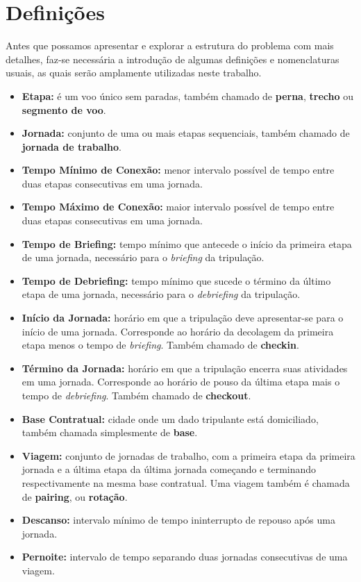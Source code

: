 
\section{Definições}
\label{sec:definicoes}

Antes que possamos apresentar e explorar a estrutura do problema com mais detalhes, faz-se
necessária a introdução de algumas definições e nomenclaturas usuais, as quais serão amplamente
utilizadas neste trabalho.

\begin{itemize}
	\item {\bf Etapa:} é um voo único sem paradas, também chamado de {\bf perna}, {\bf trecho} ou 
	{\bf segmento de voo}.
	\item {\bf Jornada:} conjunto de uma ou mais etapas sequenciais, também chamado de {\bf jornada 
	de trabalho}. 
	\item {\bf Tempo Mínimo de Conexão:} menor intervalo possível de tempo entre duas etapas 
	consecutivas em uma jornada.
	\item {\bf Tempo Máximo de Conexão:} maior intervalo possível de tempo entre duas etapas 
	consecutivas em uma jornada.
	\item {\bf Tempo de Briefing:} tempo mínimo que antecede o início da primeira etapa de uma
	jornada, necessário para o {\it briefing} da tripulação.
	\item {\bf Tempo de Debriefing:} tempo mínimo que sucede o término da último etapa de uma
	jornada, necessário para o {\it debriefing} da tripulação.
	\item {\bf Início da Jornada:} horário em que a tripulação deve apresentar-se para o início
	de uma jornada. Corresponde ao horário da decolagem da primeira etapa menos o tempo de 
	{\it briefing}. 
	Também chamado de {\bf checkin}.
	\item {\bf Término da Jornada:} horário em que a tripulação encerra suas atividades em uma 
	jornada. Corresponde ao horário de pouso da última etapa mais o tempo de {\it debriefing}.
	Também chamado de {\bf checkout}.
	\item {\bf Base Contratual:} cidade onde um dado tripulante está domiciliado, também
	chamada simplesmente de {\bf base}.
	\item {\bf Viagem:} conjunto de jornadas de trabalho, com a primeira etapa da primeira
	jornada e a última etapa da última jornada começando e terminando respectivamente na mesma
	base contratual. Uma viagem também é chamada de {\bf pairing}, ou {\bf rotação}.
	\item {\bf Descanso:} intervalo mínimo de tempo ininterrupto de repouso após uma jornada.
	\item {\bf Pernoite:} intervalo de tempo separando duas jornadas consecutivas de uma viagem.
\end{itemize}

